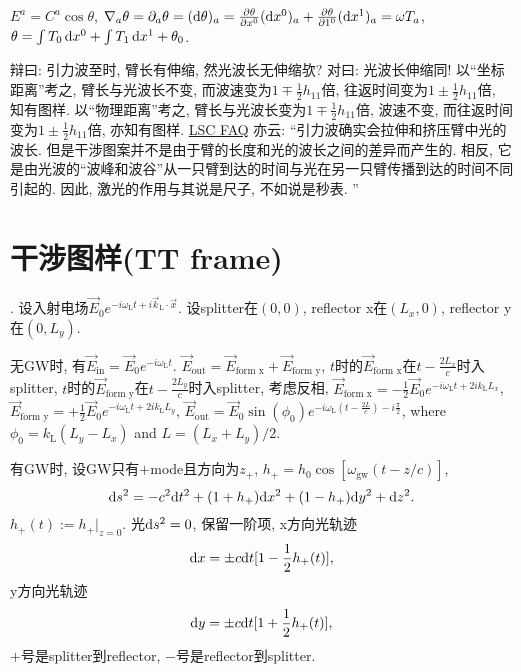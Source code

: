 $E^a=C^a\cos\theta$, $\nabla_a\theta=\partial_a\theta=(\mathrm{d}\theta)_a=\frac{\partial\theta}{\partial x^0}(\mathrm{d} x^0)_a+\frac{\partial\theta}{\partial 1^0}(\mathrm{d} x^1)_a=\omega T_a$, $\theta=\int T_0\,\mathrm{d} x^0+\int T_1\,\mathrm{d} x^1+\theta_0$.

辩曰: 引力波至时, 臂长有伸缩, 然光波长无伸缩欤? 对曰: 光波长伸缩同! 以``坐标距离''考之, 臂长与光波长不变, 而波速变为$1\mp\frac{1}{2}h_{11}$倍, 往返时间变为$1\pm\frac{1}{2}h_{11}$倍, 知有图样. 以``物理距离''考之, 臂长与光波长变为$1\mp\frac{1}{2}h_{11}$倍, 波速不变, 而往返时间变为$1\pm\frac{1}{2}h_{11}$倍, 亦知有图样. \href{https://www.ligo.org/science/faq.php}{LSC FAQ} 亦云: ``引力波确实会拉伸和挤压臂中光的波长. 但是干涉图案并不是由于臂的长度和光的波长之间的差异而产生的. 相反, 它是由光波的``波峰和波谷''从一只臂到达的时间与光在另一只臂传播到达的时间不同引起的. 因此, 激光的作用与其说是尺子, 不如说是秒表. ''

\section{干涉图样(TT frame)}\label{TT_explanation}

\cite{Maggiore2014}. 设入射电场$\vec{E}_0e^{-i\omega_\text{L}t+i\vec{k}_\text{L}\cdot\vec{x}}$. 设splitter在$(0,0)$, reflector x在$(L_x,0)$, reflector y在$(0,L_y)$.

无GW时, 有$\vec{E}_\text{in}=\vec{E}_0e^{-i\omega_\text{L}t}$. $\vec{E}_\text{out}=\vec{E}_\text{form x}+\vec{E}_\text{form y}$, $t$时的$\vec{E}_\text{form x}$在$t-\frac{2L_x}{c}$时入splitter, $t$时的$\vec{E}_\text{form y}$在$t-\frac{2L_y}{c}$时入splitter, 考虑反相, $\vec{E}_\text{form x}=-\frac{1}{2}\vec{E}_0e^{-i\omega_\text{L}t+2ik_\text{L}L_x}$, $\vec{E}_\text{form y}=+\frac{1}{2}\vec{E}_0e^{-i\omega_\text{L}t+2ik_\text{L}L_y}$, $\vec{E}_\text{out}=\vec{E}_0\sin(\phi_0)e^{-i\omega_\text{L}(t-\frac{2L}{c})-i\frac{\pi}{2}}$, where $\phi_0=k_\text{L}(L_y-L_x)$ and $L=(L_x+L_y)/2$.

有GW时, 设GW只有$+$mode且方向为$z_+$, $h_+=h_0\cos[\omega_\text{gw}(t-z/c)]$, 
\begin{equation}
    \mathrm{d} s^2=-c^2\mathrm{d} t^2+(1 +h_+)\mathrm{d} x^2+ (1-h_+)\mathrm{d} y^2+\mathrm{d} z^2.
\end{equation}
$h_+(t):=h_+|_{z=0}$. 光$\mathrm{d} s^2=0$, 保留一阶项, x方向光轨迹
\begin{equation}
    \mathrm{d} x=\pm c\mathrm{d} t[1-\frac{1}{2}h_+(t)],
\end{equation}
y方向光轨迹
\begin{equation}
    \mathrm{d} y=\pm c\mathrm{d} t[1+\frac{1}{2}h_+(t)],
\end{equation}
$+$号是splitter到reflector, $-$号是reflector到splitter. 

